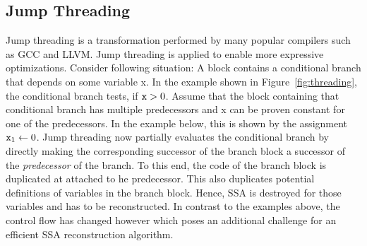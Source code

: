 \subsection{Jump Threading}

Jump threading is a transformation performed by many popular compilers such as GCC and LLVM.
Jump threading is applied to enable more expressive optimizations. 
Consider following situation:
A block contains a conditional branch that depends on some variable \var x.
In the example shown in Figure~\ref{fig:threading}, the conditional branch tests, if $\mathtt{x}> 0$.
Assume that the block containing that conditional branch has multiple predecessors and \var x can be proven constant for one of the predecessors.
In the example below, this is shown by the assignment $\mathtt{x}_1\gets 0$. 
Jump threading now partially evaluates the conditional branch by directly making the corresponding successor of the branch block a successor of the \emph{predecessor} of the branch.
To this end, the code of the branch block is duplicated at attached to he predecessor. 
This also duplicates potential definitions of variables in the branch block.
Hence, SSA is destroyed for those variables and has to be reconstructed. 
In contrast to the examples above, the control flow has changed however which poses an additional challenge for an efficient SSA reconstruction algorithm. 
